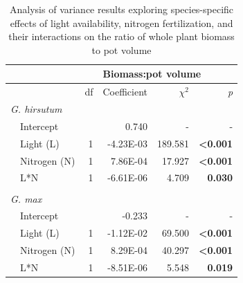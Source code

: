 \newpage
\begin{table}[]
    \caption{Analysis of variance results exploring species-specific effects of light availability, nitrogen fertilization, and their interactions on the ratio of whole plant biomass to pot volume}
    \label{table:tab.a2}
    \centering
        \begin{tabular}{p{0.1cm}p{2.5cm}p{0.5cm}p{1.75cm}p{1.5cm}p{1.5cm}}
         &&& 
         \multicolumn{3}{l}{Biomass:pot volume} 
         \\
         \hline 
         && 
         \multicolumn{1}{r}{df}
         & \multicolumn{1}{r}{Coefficient} & \multicolumn{1}{r}{$\chi^{2}$} & \multicolumn{1}{r}{\textit{p}}
         \\ 
         \hline
         
         \multicolumn{2}{l}{\textit{G. hirsutum}} &&&&  \\
         & Intercept 
         && \multicolumn{1}{r}{0.740} & \multicolumn{1}{r}{-} & \multicolumn{1}{r}{-} 
         \\
         
         & Light (L)            
         & \multicolumn{1}{r}{1}
         & \multicolumn{1}{r}{-4.23E-03}    & \multicolumn{1}{r}{189.581}    & \multicolumn{1}{r}{\textbf{<0.001}}
         \\
         
         & Nitrogen (N)
         & \multicolumn{1}{r}{1} 
         & \multicolumn{1}{r}{7.86E-04}    & \multicolumn{1}{r}{17.927}    & \multicolumn{1}{r}{\textbf{<0.001}}
         \\
         
         & L*N
         & \multicolumn{1}{r}{1}            
         & \multicolumn{1}{r}{-6.61E-06}     & \multicolumn{1}{r}{4.709}     & \multicolumn{1}{r}{\textbf{0.030}}              
         \\
         &&&&& \\

         \multicolumn{2}{l}{\textit{G. max}} &&&&  \\
         & Intercept 
         && \multicolumn{1}{r}{-0.233} & \multicolumn{1}{r}{-} & \multicolumn{1}{r}{-} 
         \\
         
         & Light (L)            
         & \multicolumn{1}{r}{1}
         & \multicolumn{1}{r}{-1.12E-02}    & \multicolumn{1}{r}{69.500}    & \multicolumn{1}{r}{\textbf{<0.001}}
         \\
         
         & Nitrogen (N)
         & \multicolumn{1}{r}{1} 
         & \multicolumn{1}{r}{8.29E-04}    & \multicolumn{1}{r}{40.297}    & \multicolumn{1}{r}{\textbf{<0.001}}
         \\
         
         & L*N
         & \multicolumn{1}{r}{1}            
         & \multicolumn{1}{r}{-8.51E-06}     & \multicolumn{1}{r}{5.548}     & \multicolumn{1}{r}{\textbf{0.019}}              
         \\

        \end{tabular}%
    \end{table}
